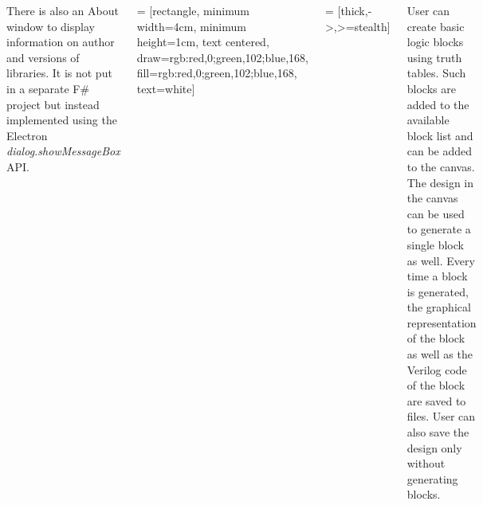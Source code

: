 \documentclass[12pt, a1paper, landscape, margin=10mm, innermargin=15mm, blockverticalspace=15mm, colspace=15mm, subcolspace=8mm]{tikzposter}
\begin{document}
\begin{columns}
{

There is also an About window to display information on author and versions of libraries. It is not put in a separate F\# project but instead implemented using the Electron \textit{dialog.showMessageBox} API.
    }

    {
 = [rectangle, minimum width=4cm, minimum height=1cm, text centered, draw={rgb:red,0;green,102;blue,168}, fill={rgb:red,0;green,102;blue,168}, text=white]

 = [thick,->,>=stealth]


User can create basic logic blocks using truth tables. Such blocks are added to the available block list and can be added to the canvas. The design in the canvas can be used to generate a single block as well. Every time a block is generated, the graphical representation of the block as well as the Verilog code of the block are saved to files. User can also save the design only without generating blocks.
    }
    

\end{columns}
\end{document}
